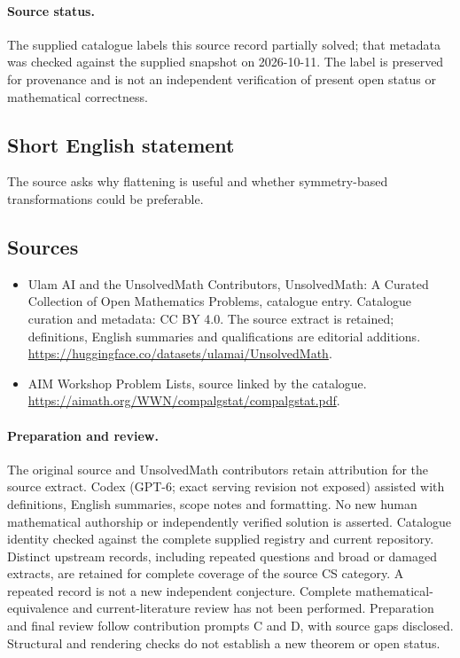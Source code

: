 \documentclass[11pt]{article}
\begin{document}
\paragraph{Source status.}
The supplied catalogue labels this source record partially solved; that metadata was checked against the supplied snapshot on 2026-10-11. The label is preserved for provenance and is not an independent verification of present open status or mathematical correctness.
\subsection{Short English statement}
The source asks why flattening is useful and whether symmetry-based transformations could be preferable.
\subsection{Sources}
\begin{itemize}
\item[S1] Ulam AI and the UnsolvedMath Contributors, UnsolvedMath: A Curated Collection of Open Mathematics Problems, catalogue entry. Catalogue curation and metadata: CC BY 4.0. The source extract is retained; definitions, English summaries and qualifications are editorial additions.
\url{https://huggingface.co/datasets/ulamai/UnsolvedMath}.
\item[S2] AIM Workshop Problem Lists, source linked by the catalogue.
\url{https://aimath.org/WWN/compalgstat/compalgstat.pdf}.
\end{itemize}
\paragraph{Preparation and review.}
The original source and UnsolvedMath contributors retain attribution for the source extract. Codex (GPT-6; exact serving revision not exposed) assisted with definitions, English summaries, scope notes and formatting. No new human mathematical authorship or independently verified solution is asserted. Catalogue identity checked against the complete supplied registry and current repository. Distinct upstream records, including repeated questions and broad or damaged extracts, are retained for complete coverage of the source CS category. A repeated record is not a new independent conjecture. Complete mathematical-equivalence and current-literature review has not been performed. Preparation and final review follow contribution prompts C and D, with source gaps disclosed. Structural and rendering checks do not establish a new theorem or open status.
\label{end:statement}
\end{document}
